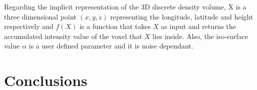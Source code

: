 \documentclass{subfiles}
\begin{document}
\par Regarding the implicit representation of the 3D discrete density volume, X is a three dimensional point $\mathit{(x, y, z) }$ representing the longitude, latitude and height respectively and ${f(X)}$ is a function that takes  $\mathit{X}$ as input and returns the accumulated intensity value of the voxel that  $\mathit{X}$ lies inside. Also, the iso-surface value $\mathit{\alpha }$ is a user defined parameter and it is noise dependant. 


\section{Conclusions}
\end{document}
